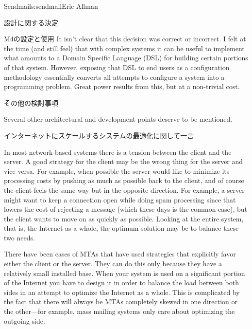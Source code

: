 \begin{aosachapter}{Sendmail}{s:sendmail}{Eric Allman}
\begin{aosasect1}{設計に関する決定}
\begin{aosasect2}{M4の設定と使用}
It isn't clear that this decision was correct or incorrect.
I felt at the time (and still feel) that with complex systems
it can be useful to implement what amounts to a Domain Specific Language (DSL)
for building certain portions of that system.
However, exposing that DSL to end users as a configuration methodology
essentially converts all attempts to configure a system
into a programming problem.
Great power results from this, but at a non-trivial cost.

\end{aosasect2}

\end{aosasect1}

\begin{aosasect1}{その他の検討事項}

Several other architectural and development points deserve to be
mentioned.

\begin{aosasect2}{インターネットにスケールするシステムの最適化に関して一言}

In most network-based systems there is a tension between the client
and the server. A good strategy for the client may be the
wrong thing for the server and vice versa. For example, when possible
the server would like to minimize its processing costs by pushing as
much as possible back to the client, and of course the client feels
the same way but in the opposite direction. For example, a server
might want to keep a connection open while doing spam processing since
that lowers the cost of rejecting a message (which these days is the
common case), but the client wants to move on as quickly as
possible. Looking at the entire system, that is, the Internet as a
whole, the optimum solution may be to balance these two needs.

There have been cases of MTAs that have used strategies that
explicitly favor either the client or the server. They can do this
only because they have a relatively small installed base.  When your
system is used on a significant portion of the Internet you have to
design it in order to balance the load between both sides in an
attempt to optimize the Internet as a whole. This is complicated by
the fact that there will always be MTAs completely skewed in one
direction or the other---for example, mass mailing systems only care
about optimizing the outgoing side.


\end{aosasect2}
\end{aosasect1}
\end{aosachapter}
